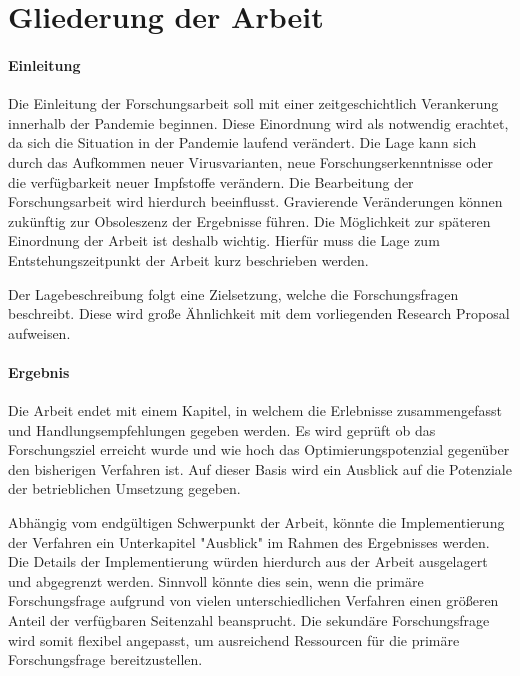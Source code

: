 
\chapter{Gliederung der Arbeit}
\subsubsection{Einleitung}
Die Einleitung der Forschungsarbeit soll mit einer zeitgeschichtlich Verankerung innerhalb der Pandemie beginnen.
Diese Einordnung wird als notwendig erachtet, da sich die Situation in der Pandemie laufend verändert.
Die Lage kann sich durch das Aufkommen neuer Virusvarianten, neue Forschungserkenntnisse oder die verfügbarkeit neuer Impfstoffe verändern.
Die Bearbeitung der Forschungsarbeit wird hierdurch beeinflusst.
Gravierende Veränderungen können zukünftig zur Obsoleszenz der Ergebnisse führen.
Die Möglichkeit zur späteren Einordnung der Arbeit ist deshalb wichtig.
Hierfür muss die Lage zum Entstehungszeitpunkt der Arbeit kurz beschrieben werden.

Der Lagebeschreibung folgt eine Zielsetzung, welche die Forschungsfragen beschreibt.
Diese wird große Ähnlichkeit mit dem vorliegenden Research Proposal aufweisen.


\subsubsection{Ergebnis}
Die Arbeit endet mit einem Kapitel, in welchem die Erlebnisse zusammengefasst und Handlungsempfehlungen gegeben werden.
Es wird geprüft ob das Forschungsziel erreicht wurde und wie hoch das Optimierungspotenzial gegenüber den bisherigen Verfahren ist.
Auf dieser Basis wird ein Ausblick auf die Potenziale der betrieblichen Umsetzung gegeben.

Abhängig vom endgültigen Schwerpunkt der Arbeit, könnte die Implementierung der Verfahren ein Unterkapitel "Ausblick" im Rahmen des Ergebnisses werden.
Die Details der Implementierung würden hierdurch aus der Arbeit ausgelagert und abgegrenzt werden.
Sinnvoll könnte dies sein, wenn die primäre Forschungsfrage aufgrund von vielen unterschiedlichen Verfahren einen größeren Anteil der verfügbaren Seitenzahl beansprucht.
Die sekundäre Forschungsfrage wird somit flexibel angepasst, um ausreichend Ressourcen für die primäre Forschungsfrage bereitzustellen.